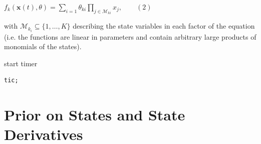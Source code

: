 \begin{par}
$f_{k}(\mathbf{x}(t),\theta) = \sum_{i=1} \theta_{ki} \prod_{j \in\mathcal{M}_{ki}} x_j, \qquad (2)$
\end{par} \vspace{1em}
\begin{par}

\noindent with $\mathcal{M}_{k_i} \subseteq \{ 1, \dots, K\}$ describing the state variables in each factor of the equation (i.e. the functions are linear in parameters and contain arbitrary large products of monomials of the states). 


\begin{par}
start timer
\end{par} \vspace{1em}
\color{RoyalPurple}\begin{verbatim}
tic;
\end{verbatim} 
\color{black}


\section{Prior on States and State Derivatives}


\end{par}
